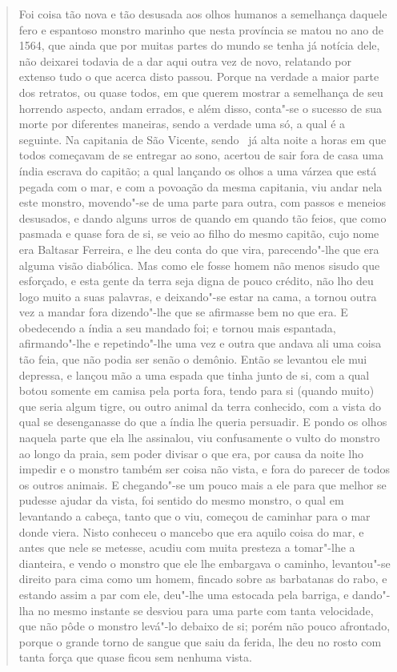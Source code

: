 \documentclass[12pt]{extarticle}
\begin{document}
\begin{enumerate}
\begin{quote} Foi coisa tão nova e tão desusada aos olhos humanos a 
semelhança daquele fero e espantoso monstro marinho que nesta província 
se matou no ano de 1564, que ainda que por muitas partes do mundo se 
tenha já notícia dele, não deixarei todavia de a dar aqui outra vez de 
novo, relatando por extenso tudo o que acerca disto passou. Porque na 
verdade a maior parte dos retratos, ou quase todos, em que querem mostrar 
a semelhança de seu horrendo aspecto, andam errados, e além disso,
conta"-se o sucesso de sua morte por diferentes maneiras, sendo a
verdade uma só, a qual é a seguinte. Na capitania de São Vicente, sendo				\
já alta noite a horas em que todos começavam de se entregar ao sono,
acertou de sair fora de casa uma índia escrava do capitão; a qual
lançando os olhos a uma várzea que está pegada com o mar, e com a
povoação da mesma capitania, viu andar nela este monstro, movendo"-se de
uma parte para outra, com passos e meneios desusados, e dando alguns urros
de quando em quando tão feios, que como pasmada e quase fora de si, se
veio ao filho do mesmo capitão, cujo nome era Baltasar Ferreira, e lhe
deu conta do que vira, parecendo"-lhe que era alguma visão diabólica.
Mas como ele fosse homem não menos sisudo que esforçado, e esta gente
da terra seja digna de pouco crédito, não lho deu logo muito a suas
palavras, e deixando"-se estar na cama, a tornou outra vez a mandar
fora dizendo"-lhe que se afirmasse bem no que era. E obedecendo a índia
a seu mandado foi; e tornou mais espantada, afirmando"-lhe e
repetindo"-lhe uma vez e outra que andava ali uma coisa tão feia, que não
podia ser senão o demônio. Então se levantou ele mui depressa, e
lançou mão a uma espada que tinha junto de si, com a qual botou somente
em camisa pela porta fora, tendo para si (quando muito) que seria algum
tigre, ou outro animal da terra conhecido, com a vista do qual se
desenganasse do que a índia lhe queria persuadir. E pondo os olhos
naquela parte que ela lhe assinalou, viu confusamente o vulto do
monstro ao longo da praia, sem poder divisar o que era, por causa da
noite lho impedir e o monstro também ser coisa não vista, e fora do
parecer de todos os outros animais. E chegando"-se um pouco mais a ele
para que melhor se pudesse ajudar da vista, foi sentido do mesmo
monstro, o qual em levantando a cabeça, tanto que o viu, começou de
caminhar para o mar donde viera. Nisto conheceu o mancebo que
era aquilo coisa do mar, e antes que nele se metesse, acudiu com muita
presteza a tomar"-lhe a dianteira, e vendo o monstro que ele lhe embargava 
o caminho, levantou"-se direito para cima como um homem, fincado sobre as 
barbatanas do rabo, e estando assim a par com ele, deu"-lhe uma estocada 
pela barriga, e dando"-lha no mesmo instante se desviou para uma parte 
com tanta velocidade, que não pôde o monstro levá"-lo debaixo de si; 
porém não pouco afrontado, porque o grande torno
de sangue que saiu da ferida, lhe deu no rosto com tanta força que
quase ficou sem nenhuma vista.
\end{quote}


\end{enumerate}
\end{document}
